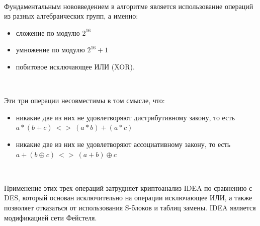 \documentclass[a4paper]{report}
\begin{document}
~

Фундаментальным нововведением в алгоритме является использование операций из разных алгебраических групп, а именно:
\begin{itemize}
\item сложение по модулю $2^{16}$
\item умножение по модулю $2^{16}+1$
\item побитовое исключающее ИЛИ (XOR).
\end{itemize}

~

Эти три операции несовместимы в том смысле, что:
\begin{itemize}
\item никакие две из них не удовлетворяют дистрибутивному закону, то есть \\ $a*(b+c)\ <>\ (a*b)+(a*c)$
\item никакие две из них не удовлетворяют ассоциативному закону, то есть \\ $a+(b\oplus c)\ <>\ (a+b)\oplus c$
\end{itemize}

~

Применение этих трех операций затрудняет криптоанализ IDEA по сравнению с DES, который основан исключительно на операции исключающее ИЛИ, а также позволяет отказаться от использования S-блоков и таблиц замены. IDEA является модификацией сети Фейстеля.
\end{document}
